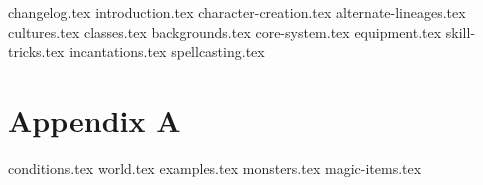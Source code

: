 \documentclass[10pt,twoside,twocolumn,openany]{dndbook}
\begin{document}
{changelog.tex}
{introduction.tex}
{character-creation.tex}
{alternate-lineages.tex}
{cultures.tex}
{classes.tex}
{backgrounds.tex}
{core-system.tex}
{equipment.tex}
{skill-tricks.tex}
{incantations.tex}
{spellcasting.tex}
\chapter{Appendix A}\label{ch:appendix}
{conditions.tex}
{world.tex}
{examples.tex}
{monsters.tex}
{magic-items.tex}
\end{document}
